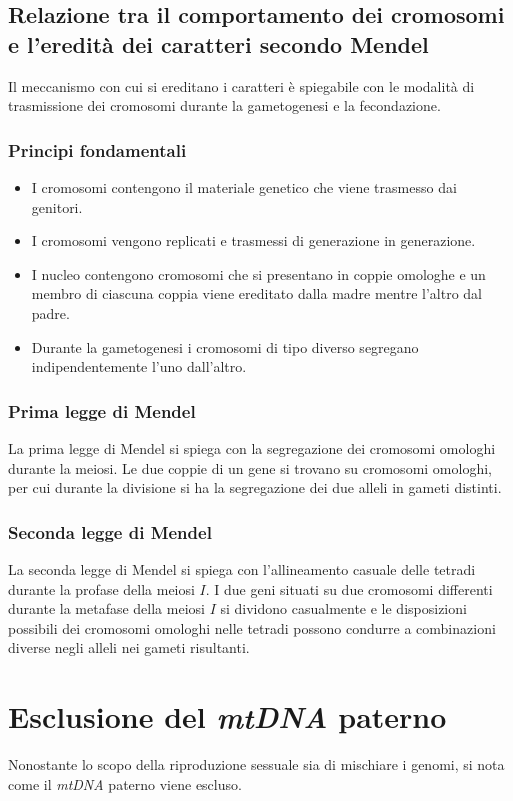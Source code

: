 	\subsection{Relazione tra il comportamento dei cromosomi e l'eredit\`a dei caratteri secondo Mendel}
	Il meccanismo con cui si ereditano i caratteri \`e spiegabile con le modalit\`a di trasmissione dei cromosomi durante la gametogenesi e la fecondazione.
		
		\subsubsection{Principi fondamentali}
		\begin{itemize}
			\item I cromosomi contengono il materiale genetico che viene trasmesso dai genitori.
			\item I cromosomi vengono replicati e trasmessi di generazione in generazione.
			\item I nucleo contengono cromosomi che si presentano in coppie omologhe e un membro di ciascuna coppia viene ereditato dalla madre mentre l'altro dal padre.
			\item Durante la gametogenesi i cromosomi di tipo diverso segregano indipendentemente l'uno dall'altro.
		\end{itemize}

		\subsubsection{Prima legge di Mendel}
		La prima legge di Mendel si spiega con la segregazione dei cromosomi omologhi durante la meiosi.
		Le due coppie di un gene si trovano su cromosomi omologhi, per cui durante la divisione si ha la segregazione dei due alleli in gameti distinti.

		\subsubsection{Seconda legge di Mendel}
		La seconda legge di Mendel si spiega con l'allineamento casuale delle tetradi durante la profase della meiosi $I$.
		I due geni situati su due cromosomi differenti durante la metafase della meiosi $I$ si dividono casualmente e le disposizioni possibili dei cromosomi omologhi nelle tetradi possono condurre a combinazioni diverse negli alleli nei gameti risultanti.

\section{Esclusione del \emph{mtDNA} paterno}
Nonostante lo scopo della riproduzione sessuale sia di mischiare i genomi, si nota come il \emph{mtDNA} paterno viene escluso.

